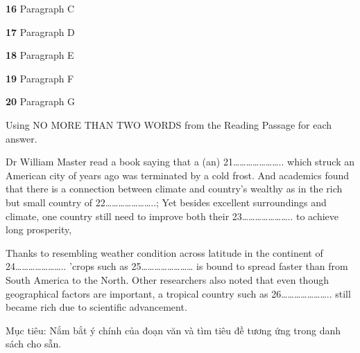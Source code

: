 \documentclass{../templateReading/cdreading}
\begin{document}
\textbf{16} Paragraph C

\textbf{17} Paragraph D

\textbf{18} Paragraph E

\textbf{19} Paragraph F

\textbf{20} Paragraph G



Using NO MORE THAN TWO WORDS from the Reading Passage for each answer.


Dr William Master read a book saying that a (an) 21………………….. which struck an American city of years ago was terminated by a cold frost. And academics found that there is a connection between climate and country’s wealthy as in the rich but small country of 22…………………..; Yet besides excellent surroundings and climate, one country still need to improve both their 23………………….. to achieve long prosperity,

Thanks to resembling weather condition across latitude in the continent of 24………………….. ’crops such as 25…………………… is bound to spread faster than from South America to the North. Other researchers also noted that even though geographical factors are important, a tropical country such as 26………………….. still became rich due to scientific advancement.



Mục tiêu: Nắm bắt ý chính của đoạn văn và tìm tiêu đề tương ứng trong danh sách cho sẵn.
\end{document}
